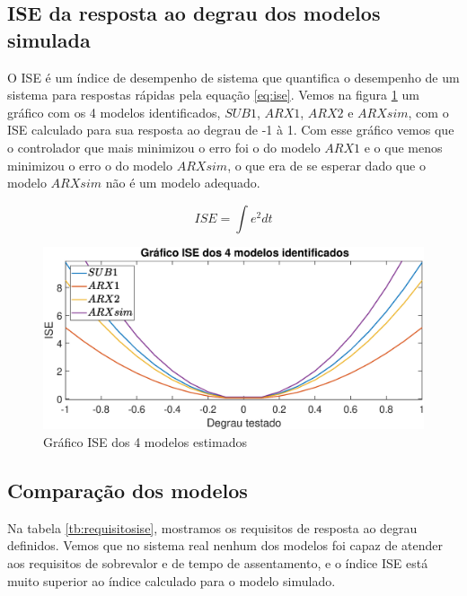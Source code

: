 \subsection{ISE da resposta ao degrau dos modelos simulada}

O ISE é um índice de desempenho de sistema que quantifica o desempenho de um sistema para respostas rápidas pela equação \eqref{eq:ise}. Vemos na figura \ref{fig:ise} um gráfico com os 4 modelos identificados, $SUB1$, $ARX1$, $ARX2$ e $ARXsim$, com o ISE calculado para sua resposta ao degrau de -1 à 1. Com esse gráfico vemos que o controlador que mais minimizou o erro foi o do modelo $ARX1$ e o que menos minimizou o erro o do modelo $ARXsim$, o que era de se esperar dado que o modelo $ARXsim$ não é um modelo adequado. 

\begin{equation}\label{eq:ise}
ISE=\int e^2 dt
\end{equation}

\begin{figure}[htb]
	\centering
	\includegraphics[width=1\linewidth]{pasta1_figuras/ise}
	\caption[Gráfico ISE dos 4 modelos estimados]{Gráfico ISE dos 4 modelos estimados}
	\label{fig:ise}
\end{figure}

\subsection{Comparação dos modelos}

Na tabela \ref{tb:requisitosise}, mostramos os requisitos de resposta ao degrau definidos. Vemos que no sistema real nenhum dos modelos foi capaz de atender aos requisitos de sobrevalor e de tempo de assentamento, e o índice ISE está muito superior ao índice calculado para o modelo simulado.

